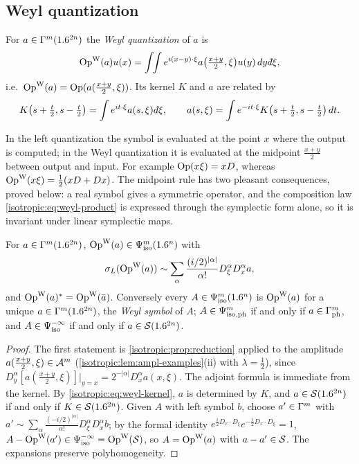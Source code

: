 \subsection{Weyl quantization}

For $a\in\Gamma^{m}(1.6^{2n})$ the \emph{Weyl quantization} of $a$ is
\begin{equation*}
  \OpW(a)u(x)=\int\!\!\int e^{i(x-y)\cdot\xi}a\bigl(\tfrac{x+y}2,\xi\bigr)u(y)\,dy\,\dbar\xi ,
\end{equation*}
i.e.\ $\operatorname{Op}^{\mathrm{W}}(a)=\operatorname{Op}(a(\frac{x+y}2,\xi))$. Its kernel $K$ and $a$ are related by
\begin{equation}\label{isotropic:eq:weyl-kernel}
  K\bigl(s+\tfrac t2,s-\tfrac t2\bigr)=\int e^{it\cdot\xi}a(s,\xi)\,\dbar\xi,\qquad
  a(s,\xi)=\int e^{-it\cdot\xi}K\bigl(s+\tfrac t2,s-\tfrac t2\bigr)\,dt .
\end{equation}

\begin{discussion}
In the left quantization the symbol is evaluated at the point $x$ where the
output is computed; in the Weyl quantization it is evaluated at the midpoint
$\frac{x+y}2$ between output and input. For example $\operatorname{Op}(x\xi)=xD$, whereas
$\operatorname{Op}^{\mathrm{W}}(x\xi)=\frac12(xD+Dx)$. The midpoint rule has two pleasant
consequences, proved below: a real symbol gives a symmetric operator, and
the composition law \eqref{isotropic:eq:weyl-product} is expressed through
the symplectic form alone, so it is invariant under linear symplectic maps.
\end{discussion}

\begin{proposition}\label{isotropic:prop:weyl}
For $a\in\Gamma^{m}(1.6^{2n})$, $\operatorname{Op}^{\mathrm{W}}(a)\in\Psi^{m}_{\mathrm{iso}}(1.6^n)$ with
\begin{equation*}
  \sigma_L(\operatorname{Op}^{\mathrm{W}}(a))\sim\sum_\alpha\frac{(i/2)^{|\alpha|}}{\alpha!}D_\xi^\alpha D_x^\alpha a ,
\end{equation*}
and $\operatorname{Op}^{\mathrm{W}}(a)^*=\operatorname{Op}^{\mathrm{W}}(\bar a)$. Conversely every $A\in\Psi^{m}_{\mathrm{iso}}(1.6^n)$ is
$\operatorname{Op}^{\mathrm{W}}(a)$ for a unique $a\in\Gamma^{m}(1.6^{2n})$, the \emph{Weyl symbol} of $A$;
$A\in\Psi^{m}_{\mathrm{iso,ph}}$ if and only if $a\in\Gamma^{m}_{\mathrm{ph}}$, and $A\in\Psi^{-\infty}_{\mathrm{iso}}$
if and only if $a\in\mathcal{S}(1.6^{2n})$.
\end{proposition}
\begin{proof}
The first statement is \cref{isotropic:prop:reduction} applied to the
amplitude $a(\frac{x+y}2,\xi)\in\mathcal{A}^{m}$
(\cref{isotropic:lem:ampl-examples}(ii) with $\lambda=\frac12$), since
$D_y^\alpha[a(\frac{x+y}2,\xi)]|_{y=x}=2^{-|\alpha|}D_x^\alpha a(x,\xi)$. The
adjoint formula is immediate from the kernel. By
\eqref{isotropic:eq:weyl-kernel}, $a$ is determined by $K$, and
$a\in\mathcal{S}(1.6^{2n})$ if and only if $K\in\mathcal{S}(1.6^{2n})$. Given $A$ with left symbol
$b$, choose $a'\in\Gamma^{m}$ with $a'\sim\sum_\alpha\frac{(-i/2)^{|\alpha|}}{\alpha!}D_\xi^\alpha D_x^\alpha b$;
by the formal identity $e^{\frac i2D_x\cdot D_\xi}e^{-\frac i2D_x\cdot D_\xi}=1$,
$A-\operatorname{Op}^{\mathrm{W}}(a')\in\Psi^{-\infty}_{\mathrm{iso}}=\operatorname{Op}^{\mathrm{W}}(\mathcal{S})$, so $A=\operatorname{Op}^{\mathrm{W}}(a)$ with $a-a'\in\mathcal{S}$. The
expansions preserve polyhomogeneity.
\end{proof}

